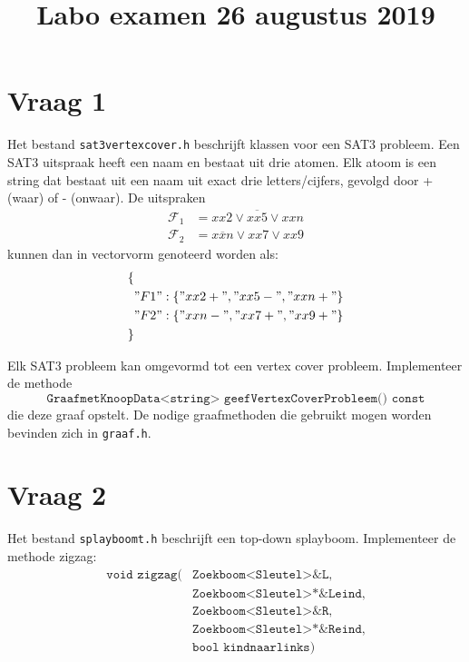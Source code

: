 \documentclass{article}
\title{Labo examen 26 augustus 2019}
\author{}
\begin{document}
    \maketitle 


    \section{Vraag 1}
    Het bestand \texttt{sat3vertexcover.h} beschrijft klassen voor een SAT3 probleem. Een SAT3 uitspraak heeft een naam en bestaat uit drie atomen. Elk atoom is een string dat bestaat uit een naam uit exact drie letters/cijfers, gevolgd door + (waar) of - (onwaar). De uitspraken
    \begin{align*}
        \mathcal{F}_1 &= xx2 \vee \overline{xx5} \vee xxn \\
        \mathcal{F}_2 &= \overline{xxn} \vee xx7 \vee xx9
    \end{align*}
    kunnen dan in vectorvorm genoteerd worden als:
    \begin{align*}
        \{& \\
         & "F1" : \{"xx2+", "xx5-", "xxn+"\} \\
         & "F2" : \{"xxn-", "xx7+", "xx9+"\} \\
        \}
    \end{align*}



    Elk SAT3 probleem kan omgevormd tot een vertex cover probleem. Implementeer de methode $$\texttt{GraafmetKnoopData<string> geefVertexCoverProbleem() const}$$
    die deze graaf opstelt. De nodige graafmethoden die gebruikt mogen worden bevinden zich in \texttt{graaf.h}.

    \section{Vraag 2}
    Het bestand \texttt{splayboomt.h} beschrijft een top-down splayboom. Implementeer de methode zigzag: 
    \begin{align*}
        \texttt{void zigzag(}&\texttt{Zoekboom<Sleutel>\& L,} \\
                            &\texttt{Zoekboom<Sleutel>*\& Leind,} \\
                            &\texttt{Zoekboom<Sleutel>\& R,} \\
                            &\texttt{Zoekboom<Sleutel>*\& Reind,} \\
                            &\texttt{bool kindnaarlinks})
    \end{align*}
\end{document}
